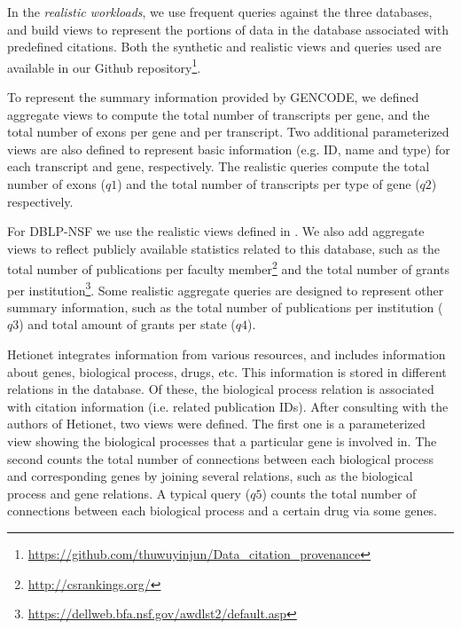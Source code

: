 
In the {\em realistic workloads}, we use frequent queries against the three databases, and build views to represent the portions of data in the database associated with predefined citations. Both the synthetic and realistic views and queries used are available in our Github repository\footnote{\url{https://github.com/thuwuyinjun/Data_citation_provenance}}. 

To represent the summary information provided by GENCODE, we defined aggregate views to compute the total number of transcripts per gene, and the total number of exons per gene and per transcript. Two additional parameterized views are also defined to represent basic information (e.g. ID, name and type) for each transcript and gene, respectively. The realistic queries  compute the total number of exons ($q1$) and the total number of transcripts per type of gene ($q2$) respectively.

For DBLP-NSF we use the realistic views defined in \cite{wu2018data}. We also add aggregate views to reflect publicly available statistics related to this database, such as the total number of publications per faculty member\footnote{\url{http://csrankings.org/}} and the total number of grants per institution\footnote{\url{https://dellweb.bfa.nsf.gov/awdlst2/default.asp}}. Some realistic aggregate queries are designed to represent other summary information, such as the total number of publications per institution ($q3$) and total amount of grants per state ($q4$).

Hetionet integrates information from various resources, and includes information about genes, biological process, drugs, etc.  This information is stored in different relations in the database. Of these, the biological process relation is associated with citation information (i.e. related publication IDs). After consulting with the authors of Hetionet, two views were defined. The first one is a parameterized view showing the  biological processes that a particular gene is involved in. The second counts the total number of connections between each biological process and corresponding genes by joining several relations, such as the biological process and gene relations.  A typical query ($q5$) counts the total number of connections between each biological process and a certain drug via some genes.


